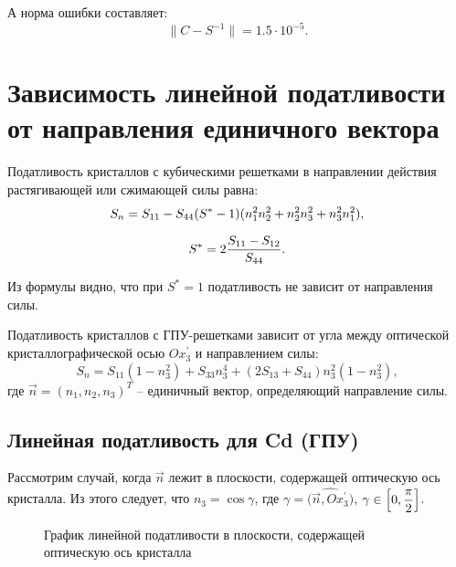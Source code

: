 \documentclass[12pt,a4paper]{article}
\begin{document}
А норма ошибки составляет:
\[
    \| C - S^{-1} \| = 1.5 \cdot 10^{-5}.
\]

\section{Зависимость линейной податливости
от направления единичного вектора}

Податливость кристаллов с кубическими решетками в направлении действия растягивающей или сжимающей силы равна:
\begin{gather}
    \label{podatCr}
    S_n=S_{11}-S_{44} (S^*-1)(n_1^2 n_2^2+n_2^2 n_3^2+n_3^2 n_1^2),
    \\[0.7em]
    S^*=2 \frac{S_{11}-S_{12}}{S_{44}}. \notag
\end{gather}

Из формулы  видно, что при $S^* = 1$ податливость не зависит от направления силы.

Податливость кристаллов с ГПУ-решетками зависит от угла между оптической кристаллографической осью $Ox^'_3$ и направлением силы:
\begin{equation}
    S_n=S_{11} (1-n_3^2)+S_{33} n_3^4+(2 S_{13}+S_{44})n_3^2(1-n_3^2),   
\end{equation}
\noindent где $\vec n = (n_1, n_2, n_3)^T$ -- единичный вектор, определяющий направление силы.

\subsection{Линейная податливость для Cd (ГПУ)}

Рассмотрим случай, когда $\vec n$ лежит в плоскости, содержащей оптическую ось кристалла. Из этого следует, что $n_3 = \cos \gamma$, где $\gamma = \widehat{\bigl(\vec n, Ox^{'}_3 \bigr)}$, $\gamma \in \Bigl[ 0, \dfrac{\pi}{2} \Bigr]$.

\pagebreak

\begin{figure}[h]
	\caption{График линейной податливости в плоскости, содержащей оптическую ось кристалла}
	\label{pic:CdOpt}
\end{figure}
\end{document}
